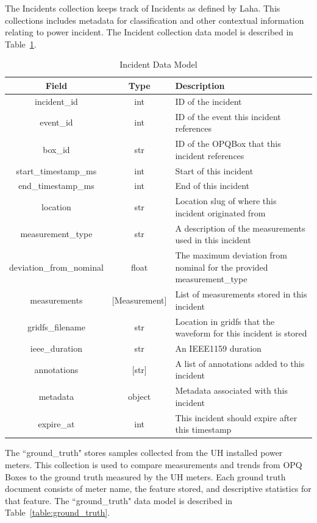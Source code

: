 The Incidents collection keeps track of Incidents as defined by Laha. This collections includes metadata for classification and other contextual information relating to power incident. The Incident collection data model is described in Table~\ref{table:Incidents}.

\begin{table}[H]
	\centering
	\caption{Incident Data Model}
	\begin{tabular}{|c|c|p{8cm}|}
		\hline
		Field & Type & Description \\
		\hline
		incident\_id & int & ID of the incident \\
		\hline
		event\_id & int & ID of the event this incident references \\
		\hline
		box\_id & str & ID of the OPQBox that this incident references \\
		\hline
		start\_timestamp\_ms & int & Start of this incident \\
		\hline
		end\_timestamp\_ms & int & End of this incident \\
		\hline
		location & str & Location slug of where this incident originated from \\
		\hline
		measurement\_type & str & A description of the measurements used in this incident \\
		\hline
		deviation\_from\_nominal & float & The maximum deviation from nominal for the provided measurement\_type \\
		\hline
		measurements & [Measurement] & List of measurements stored in this incident \\
		\hline
		gridfs\_filename & str & Location in gridfs that the waveform for this incident is stored \\
		\hline
		ieee\_duration & str & An IEEE1159 duration \\
		\hline
		annotations & [str] & A list of annotations added to this incident \\
		\hline
		metadata & object & Metadata associated with this incident \\
		\hline
		expire\_at & int & This incident should expire after this timestamp \\
		\hline
	\end{tabular}
	\label{table:Incidents}
\end{table}

The ``ground\_truth" stores samples collected from the UH installed power meters. This collection is used to compare measurements and trends from OPQ Boxes to the ground truth measured by the UH meters. Each ground truth document consists of meter name, the feature stored, and descriptive statistics for that feature. The ``ground\_truth" data model is described in Table~\ref{table:ground_truth}.

